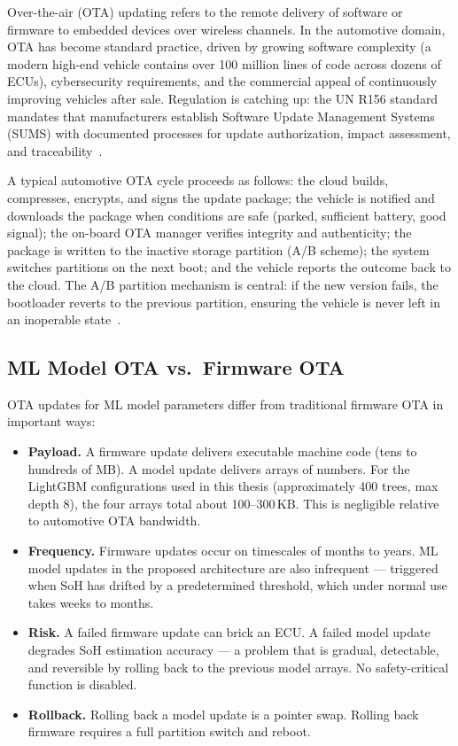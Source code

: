 Over-the-air (OTA) updating refers to the remote delivery of software or firmware to embedded devices over wireless channels. In the automotive domain, OTA has become standard practice, driven by growing software complexity (a modern high-end vehicle contains over 100 million lines of code across dozens of ECUs), cybersecurity requirements, and the commercial appeal of continuously improving vehicles after sale. Regulation is catching up: the UN R156 standard mandates that manufacturers establish Software Update Management Systems (SUMS) with documented processes for update authorization, impact assessment, and traceability~\autocite{unece_r156}.

A typical automotive OTA cycle proceeds as follows: the cloud builds, compresses, encrypts, and signs the update package; the vehicle is notified and downloads the package when conditions are safe (parked, sufficient battery, good signal); the on-board OTA manager verifies integrity and authenticity; the package is written to the inactive storage partition (A/B scheme); the system switches partitions on the next boot; and the vehicle reports the outcome back to the cloud. The A/B partition mechanism is central: if the new version fails, the bootloader reverts to the previous partition, ensuring the vehicle is never left in an inoperable state~\autocite{guissouma2022}.

\subsection{ML Model OTA vs.\ Firmware OTA}

OTA updates for ML model parameters differ from traditional firmware OTA in important ways:

\begin{itemize}
    \item \textbf{Payload.} A firmware update delivers executable machine code (tens to hundreds of MB). A model update delivers arrays of numbers. For the LightGBM configurations used in this thesis (approximately 400 trees, max depth 8), the four arrays total about 100--300\,KB. This is negligible relative to automotive OTA bandwidth.
    \item \textbf{Frequency.} Firmware updates occur on timescales of months to years. ML model updates in the proposed architecture are also infrequent --- triggered when SoH has drifted by a predetermined threshold, which under normal use takes weeks to months.
    \item \textbf{Risk.} A failed firmware update can brick an ECU. A failed model update degrades SoH estimation accuracy --- a problem that is gradual, detectable, and reversible by rolling back to the previous model arrays. No safety-critical function is disabled.
    \item \textbf{Rollback.} Rolling back a model update is a pointer swap. Rolling back firmware requires a full partition switch and reboot.
\end{itemize}

